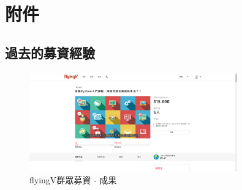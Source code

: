 \section{\centering 附件}

\subsection{過去的募資經驗}
\label{fig:Appendix-fundraising}
\begin{figure}[H]
	\centering
	\includegraphics[width=0.8\textwidth]{images/flyingv-19600.png}
	\caption{flyingV群眾募資 - 成果}
	\label{fig:flyingv}
\end{figure}

